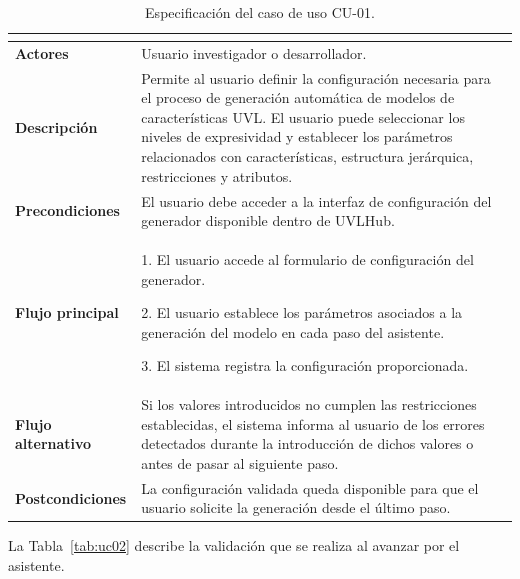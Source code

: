 \begin{table}[H]
\centering
\small
\renewcommand{\arraystretch}{1.35}
\begin{tabular}{@{}>{\bfseries\RaggedRight\arraybackslash}p{4cm} P{10cm}@{}}
\toprule
{} \\
\midrule

Actores &
Usuario investigador o desarrollador. \\

Descripción &
Permite al usuario definir la configuración necesaria para el proceso de generación automática de modelos de características UVL. El usuario puede seleccionar los niveles de expresividad y establecer los parámetros relacionados con características, estructura jerárquica, restricciones y atributos. \\

Precondiciones &
El usuario debe acceder a la interfaz de configuración del generador disponible dentro de UVLHub. \\

Flujo principal &
1. El usuario accede al formulario de configuración del generador.

2. El usuario establece los parámetros asociados a la generación del modelo en cada paso del asistente.

3. El sistema registra la configuración proporcionada. \\

Flujo alternativo &
Si los valores introducidos no cumplen las restricciones establecidas, el sistema informa al usuario de los errores detectados durante la introducción de dichos valores o antes de pasar al siguiente paso. \\

Postcondiciones &
La configuración validada queda disponible para que el usuario
solicite la generación desde el último paso. \\

\bottomrule
\end{tabular}
\caption{Especificación del caso de uso CU-01.}
\label{tab:uc01}
\end{table}

La Tabla~\ref{tab:uc02} describe la validación que se realiza al avanzar por el asistente.

